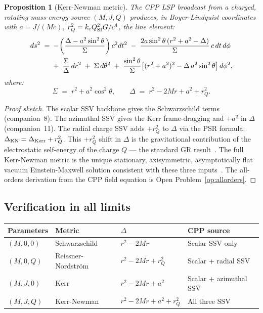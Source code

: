 \documentclass[12pt]{article}
\newtheorem{proposition}[theorem]{Proposition}
\newcommand{\rQ}{r_Q}
\newcommand{\Sig}{\Sigma}
\newcommand{\Dlt}{\Delta}
\begin{document}
\begin{proposition}[Kerr-Newman metric]
\label{prop:kn}
The CPP LSP broadcast from a charged, rotating mass-energy source
$(M, J, Q)$ produces, in Boyer-Lindquist coordinates with
$a = J/(Mc)$, $\rQ^2 = k_e Q_{\rm SI}^2 G/c^4$, the line element:
\begin{align}
  ds^2 \;=\;
  &-\!\left(\frac{\Dlt - a^2\sin^2\theta}{\Sig}\right)c^2dt^2
  \;-\; \frac{2a\sin^2\theta\,(r^2+a^2-\Dlt)}{\Sig}\,c\,dt\,d\phi
  \notag\\
  &+\; \frac{\Sig}{\Dlt}\,dr^2
  \;+\; \Sig\,d\theta^2
  \;+\; \frac{\sin^2\theta}{\Sig}
  \bigl[(r^2+a^2)^2 - \Dlt\,a^2\sin^2\theta\bigr]\,d\phi^2,
  \label{eq:kn}
\end{align}
where:
\begin{equation}
  \Sig \;=\; r^2 + a^2\cos^2\theta, \qquad
  \Dlt \;=\; r^2 - 2Mr + a^2 + \rQ^2.
  \label{eq:kn_sigma_delta}
\end{equation}
\end{proposition}

\begin{proof}[Proof sketch]
The scalar SSV backbone gives the Schwarzschild terms (companion~8).
The azimuthal SSV gives the Kerr frame-dragging and $+a^2$ in $\Dlt$
(companion~11).  The radial charge SSV adds $+\rQ^2$ to $\Dlt$
via the PSR formula: $\Dlt_{\rm KN} = \Dlt_{\rm Kerr} + \rQ^2$.
This $+\rQ^2$ shift in $\Delta$ is the gravitational contribution of
the electrostatic self-energy of the charge $Q$ — the standard
GR result~\cite{newman1965, wald1984}.  The full Kerr-Newman metric
is the unique stationary, axisymmetric, asymptotically flat vacuum
Einstein-Maxwell solution consistent with these three inputs~\cite{israel1967}.
The all-orders derivation from the CPP field equation is Open
Problem~\ref{op:allorders}.
\end{proof}

\subsection{Verification in all limits}

\begin{center}
\renewcommand{\arraystretch}{1.35}
\begin{tabular}{@{}llll@{}}
\toprule
Parameters & Metric & $\Dlt$ & CPP source \\
\midrule
$(M, 0, 0)$ & Schwarzschild & $r^2 - 2Mr$ & Scalar SSV only \\
$(M, 0, Q)$ & Reissner-Nordstr\"om & $r^2 - 2Mr + \rQ^2$ & Scalar + radial SSV \\
$(M, J, 0)$ & Kerr & $r^2 - 2Mr + a^2$ & Scalar + azimuthal SSV \\
$(M, J, Q)$ & Kerr-Newman & $r^2 - 2Mr + a^2 + \rQ^2$ & All three SSV \\
\bottomrule
\end{tabular}
\end{center}
\end{document}
